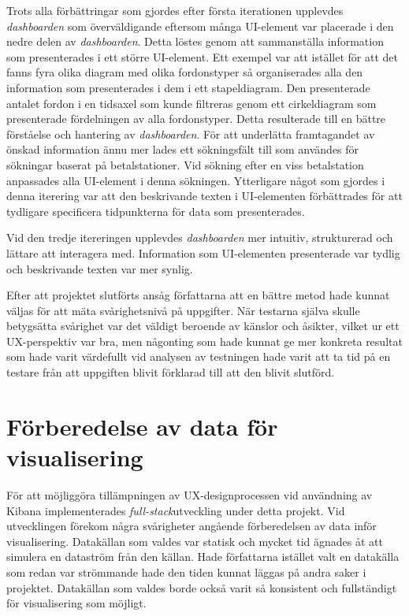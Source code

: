 \documentclass[12pt]{kththesis}
\begin{document}
Trots alla förbättringar som gjordes efter första iterationen upplevdes \textit{dashboarden} som överväldigande eftersom många UI-element var placerade i den nedre delen av \textit{dashboarden}. Detta löstes genom att sammanställa information som presenterades i ett större UI-element. Ett exempel var att istället för att det fanns fyra olika diagram med olika fordonstyper så organiserades alla den information som presenterades i dem i ett stapeldiagram. Den presenterade antalet fordon i en tidsaxel som kunde filtreras genom ett cirkeldiagram som presenterade fördelningen av alla fordonstyper. Detta resulterade till en bättre förståelse och hantering av \textit{dashboarden}. För att underlätta framtagandet av önskad information ännu mer lades ett sökningsfält till som användes för sökningar baserat på betalstationer. Vid sökning efter en viss betalstation anpassades alla UI-element i denna sökningen. Ytterligare något som gjordes i denna iterering var att den beskrivande texten i UI-elementen förbättrades för att tydligare specificera tidpunkterna för data som presenterades. 

Vid den tredje itereringen upplevdes \textit{dashboarden} mer intuitiv, strukturerad och lättare att interagera med. Information som UI-elementen presenterade var tydlig och beskrivande texten var mer synlig. 

Efter att projektet slutförts ansåg författarna att en bättre metod hade kunnat väljas för att mäta svårighetsnivå på uppgifter. När testarna själva skulle betygsätta svårighet var det väldigt beroende av känslor och åsikter, vilket ur ett UX-perspektiv var bra, men någonting som hade kunnat ge mer konkreta resultat som hade varit värdefullt vid analysen av testningen hade varit att ta tid på en testare från att uppgiften blivit förklarad till att den blivit slutförd. 

\section{Förberedelse av data för visualisering}
För att möjliggöra tillämpningen av UX-designprocessen vid användning av Kibana implementerades \textit{full-stack}utveckling under detta projekt. Vid utvecklingen förekom några svårigheter angående förberedelsen av data inför visualisering. Datakällan som valdes var statisk och mycket tid ägnades åt att simulera en dataström från den källan. Hade författarna istället valt en datakälla som redan var strömmande hade den tiden kunnat läggas på andra saker i projektet. Datakällan som valdes borde också varit så konsistent och fullständigt för visualisering som möjligt. 
\end{document}
